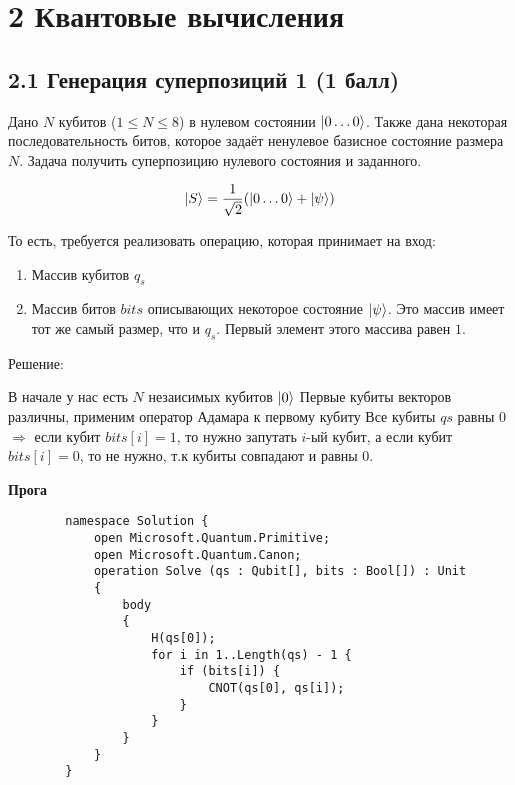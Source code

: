 \documentclass{article}
\DeclarePairedDelimiter\ket{\lvert}{\rangle}
\begin{document}
\section*{2 Квантовые вычисления}
\subsection*{2.1 Генерация суперпозиций 1 (1 балл)}
    Дано $N$ кубитов ($1 \le N \le 8$) в нулевом состоянии $\ket{0\dots0}$. 
    Также дана некоторая последовательность битов, которое задаёт ненулевое базисное состояние размера $N$. Задача получить суперпозицию нулевого состояния и заданного.
    
    $$\ket{S} = \frac{1}{\sqrt2}(\ket{0\dots0} +\ket{\psi})$$
    
    То есть, требуется реализовать операцию, которая принимает на вход:
    \begin{enumerate}
        \item Массив кубитов $q_s$
        \item Массив битов $bits$ описывающих некоторое состояние $\ket{\psi}$. Это массив имеет тот же самый размер, что и $q_s$. Первый элемент этого массива равен $1$.
    \end{enumerate}
    
    Решение:
        
    \begin{enumerate}
         В начале у нас есть $N$ незаисимых кубитов $\ket{0}$
         Первые кубиты векторов различны, применим оператор Адамара к первому кубиту
         Все кубиты $qs$ равны 0 $\Rightarrow$ если кубит $bits[i] = 1$, то нужно запутать $i$-ый кубит, а если кубит $bits[i] = 0$, то не нужно, т.к кубиты совпадают и равны 0.

    \end{enumerate}
    
    \textbf{Прога}
    
    \begin{lstlisting}
        namespace Solution {
            open Microsoft.Quantum.Primitive;
            open Microsoft.Quantum.Canon;
            operation Solve (qs : Qubit[], bits : Bool[]) : Unit 
            {
                body
                {
                    H(qs[0]);
                    for i in 1..Length(qs) - 1 {
                        if (bits[i]) {
                            CNOT(qs[0], qs[i]);
                        }
                    }
                }
            }
        }
    \end{lstlisting}
    
\end{document}
